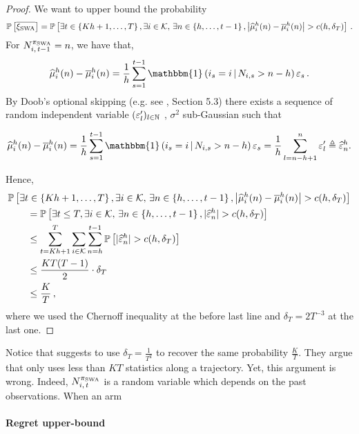 \begin{proof}
We want to upper bound the probability
\[
\PP{\bar{\HPSWA}} = \PP{\exists t \in \left\{Kh +1, \dots, T\right\},\exists i \in \arms,\,\exists n\in \left\{h, \dots, t-1\right\}, \big| \hmu_i^h(n) - \bmu_i^h(n)\big|>c(h,\delta_T) }\,.
\]
For $N_{i,\,t-1}^{\pi_{\rm SWA}} = n$, we have that, 
\[
 \hmu_i^h(n) - \bmu_i^h(n)= \frac{1}{h} \sum_{s=1}^{t-1}\mathbbm{1}\pa{i_s = i \, |\, N_{i,s}> n - h }\epsilon_s\,.
\]
By Doob's optional skipping (e.g. see \citet{chow1997probability}, Section 5.3) there exists a sequence of random independent variable $(\varepsilon'_l)_{l\in{\mathbb N}}$ , $\sigma^2$ sub-Gaussian such that 

\[\hmu_i^h(n) - \bmu_i^h(n)= \frac{1}{h} \sum_{s=1}^{t-1}\mathbbm{1}\pa{i_s = i \, |\, N_{i,s}> n - h }\epsilon_s=  \frac{1}{h} \sum_{l=n-h+1}^n \epsilon'_l \triangleq \hepsilon^h_n. \]

Hence, 
\begin{align*}
    &\PP{\exists t \in \left\{Kh +1, \dots, T\right\},\exists i \in \arms,\,\exists n \in \left\{h, \dots, t-1\right\}, \big| \hmu_i^h(n) - \bmu_i^h(n)\big|>c(h,\delta_T) }\\
    &\qquad= \PP{\exists t\leq T,\exists i \in \arms,\,\exists n \in \left\{h, \dots, t-1\right\},|\hepsilon^h_n|>c(h,\delta_T) }\\
    &\qquad\leq \sum_{t=Kh + 1}^{T}\sum_{i \in \arms} \sum_{n=h}^{t-1} \PP{|\hepsilon^h_n|>c(h,\delta_T)} \\
    &\qquad\leq  \frac{KT(T-1)}{2}\cdot \delta_T  \\
    &\qquad \leq \frac{K}{T}\,,
\end{align*}
where we used the Chernoff inequality at the before last line and $\delta_{T} = 2T^{-3}$ at the last one. 
\end{proof}


\begin{remark}
\label{rem:uncorrect-levine}
Notice that \citet{levine2017rotting} suggests to use $\delta_T = \frac{1}{T^2}$ to recover the same probability $\frac{K}{T}$. They argue that \SWA only uses less than $KT$ statistics along a trajectory. Yet, this argument is wrong. Indeed, $N_{i,\,t}^{\pi_{\rm SWA}}$ is a random variable which depends on the past observations. When an arm  %
\end{remark}


 
\paragraph{Regret upper-bound}

